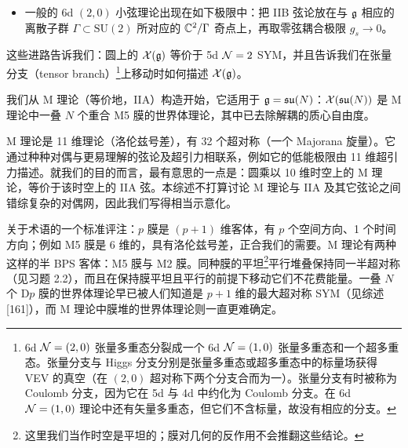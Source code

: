 \begin{itemize}[leftmargin=1.6em,itemsep=2pt,topsep=2pt]
\item 一般的 6d $(2,0)$ 小弦理论出现在如下极限中：把 IIB 弦论放在与 $\mathfrak{g}$ 相应的离散子群 $\Gamma\subset\mathrm{SU}(2)$ 所对应的 $\mathbb{C}^2/\Gamma$ 奇点上，再取零弦耦合极限 $g_s\to 0$。
\end{itemize}

这些进路告诉我们：圆上的 $\mathcal{X}(\mathfrak{g})$ 等价于 5d $\mathcal{N}=2$ SYM，并且告诉我们在张量分支（tensor branch）\footnote{6d $\mathcal{N}=(2,0)$ 张量多重态分裂成一个 6d $\mathcal{N}=(1,0)$ 张量多重态和一个超多重态。张量分支与 Higgs 分支分别是张量多重态或超多重态中的标量场获得 VEV 的真空（在 $(2,0)$ 超对称下两个分支合而为一）。张量分支有时被称为 Coulomb 分支，因为它在 5d 与 4d 中约化为 Coulomb 分支。在 6d $\mathcal{N}=(1,0)$ 理论中还有矢量多重态，但它们不含标量，故没有相应的分支。}上移动时如何描述 $\mathcal{X}(\mathfrak{g})$。

我们从 M 理论（等价地，IIA）构造开始，它适用于 $\mathfrak{g}=\mathfrak{su}(N)$：$\mathcal{X}(\mathfrak{su}(N))$ 是 M 理论中一叠 $N$ 个重合 M5 膜的世界体理论，其中已去除解耦的质心自由度。

M 理论是 11 维理论（洛伦兹号差），有 32 个超对称（一个 Majorana 旋量）。它通过种种对偶与更易理解的弦论及超引力相联系，例如它的低能极限由 11 维超引力描述。就我们的目的而言，最有意思的一点是：圆乘以 10 维时空上的 M 理论，等价于该时空上的 IIA 弦。本综述不打算讨论 M 理论与 IIA 及其它弦论之间错综复杂的对偶网，因此我们写得相当示意化。

关于术语的一个标准评注：$p$ 膜是 $(p+1)$ 维客体，有 $p$ 个空间方向、1 个时间方向；例如 M5 膜是 6 维的，具有洛伦兹号差，正合我们的需要。M 理论有两种这样的半 BPS 客体：M5 膜与 M2 膜。同种膜的平坦\footnote{这里我们当作时空是平坦的；膜对几何的反作用不会推翻这些结论。}平行堆叠保持同一半超对称（见习题 2.2），而且在保持膜平坦且平行的前提下移动它们不花费能量。一叠 $N$ 个 D$p$ 膜的世界体理论早已被人们知道是 $p+1$ 维的最大超对称 SYM（见综述 [161]），而 M 理论中膜堆的世界体理论则一直更难确定。

